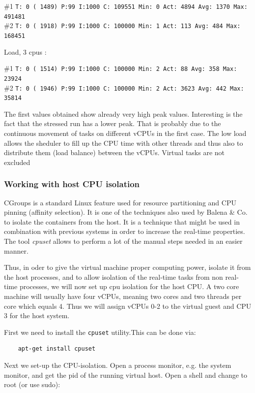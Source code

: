 \documentclass[]{scrartcl}
\begin{document}
\noindent \small \#1 \texttt{T: 0 ( 1489) P:99 I:1000 C: 109551 Min: 0 Act: 4894 Avg: 1370 Max:  491481}\\
\noindent \small \#2 \texttt{T: 0 ( 1918) P:99 I:1000 C: 100000 Min: 1 Act:  113 Avg:  484 Max:  168451}

\noindent Load, 3 cpus :

\noindent \small \#1 \texttt{T: 0 ( 1514) P:99 I:1000 C: 100000 Min: 2 Act:   88 Avg:  358 Max:   23924}\\
\noindent \small \#2 \texttt{T: 0 ( 1946) P:99 I:1000 C: 100000 Min: 2 Act: 3623 Avg:  442 Max:   35814}
\bigskip

The first values obtained show already very high peak values. Interesting is the fact that the stressed run has a lower peak. That is probably due to the continuous movement of tasks on different vCPUs in the first case. The low load allows the sheduler to fill up the CPU time with other threads and thus also to distribute them (load balance) between the vCPUs. Virtual tasks are not excluded

\subsubsection{Working with host CPU isolation}

CGroups is a standard Linux feature used for resource partitioning and CPU pinning (affinity selection). It is one of the techniques also used by Balena \& Co. to isolate the containers from the host. It is a technique that might be used in combination with previous systems in order to increase the real-time properties. The tool \textit{cpuset} allows to perform a lot of the manual steps needed in an easier manner. 

Thus, in oder to give the virtual machine proper computing power, isolate it from the host processes, and to allow isolation of the real-time tasks from non real-time processes, we will now set up cpu isolation for the host CPU. A two core machine will usually have four vCPUs, meaning two cores and two threads per core which equals 4. Thus we will assign vCPUs 0-2 to the virtual guest and CPU 3 for the host system.

First we need to install the \texttt{cpuset} utility.This can be done via:

\begin{verbatim}
	apt-get install cpuset
\end{verbatim}

Next we set-up the CPU-isolation. Open a process monitor, e.g. the system monitor, and get the pid of the running virtual host. Open a shell and change to root (or use sudo):
\end{document}
